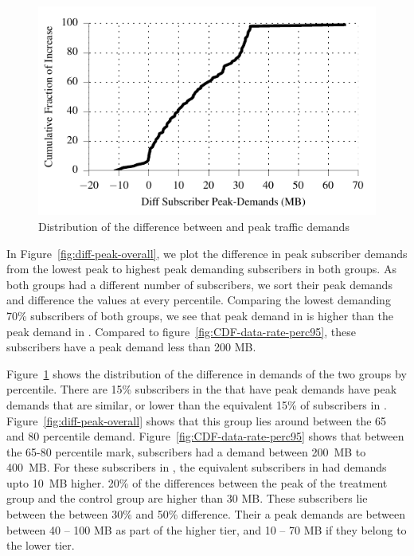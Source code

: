 \begin{figure}[t]
\centering
\includegraphics[width=\linewidth]{figures/cdf_diff_perc95_bytes_subsc-overall.pdf}
               \caption{Distribution of the difference between \treatment{} and \control{}
               peak traffic demands\label{fig:cdf-diff-perc95}}
\end{figure}


In Figure~\ref{fig:diff-peak-overall}, we plot the difference in
peak subscriber demands from the 
lowest peak to highest peak demanding subscribers in both groups.
As both groups had a different number of subscribers, we sort their peak demands
and difference the values at every percentile.
Comparing the lowest demanding 70\% subscribers of both groups, we
see that peak demand in \treatment{} is higher than the peak demand in \control{}.
Compared to figure~\ref{fig:CDF-data-rate-perc95}, these subscribers have a peak 
demand less than 200 MB.


Figure~\ref{fig:cdf-diff-perc95} shows the distribution of the difference in demands of the two
groups by percentile. There are 15\% subscribers in the \treatment{} 
that have peak demands have peak demands that are similar, or lower than the
equivalent 15\% of subscribers in \control{}. Figure~\ref{fig:diff-peak-overall} shows
that this group lies around between the 65 and 80 percentile demand. Figure~\ref{fig:CDF-data-rate-perc95}
shows that between the 65-80 percentile mark, subscribers had a demand between 
200~MB to 400~MB. For these subscribers in \treatment{}, the equivalent subscribers
in \control{} had demands upto 10~MB higher. 20\% of the differences between the peak
of the treatment group and the control group are higher than 30 MB. These subscribers
lie between the between 30\% and 50\% difference. Their a peak demands are between
between 40 -- 100 MB as part of the higher tier, and 10 -- 70 MB if they belong to
the lower tier.


